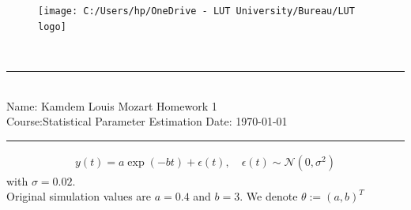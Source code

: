 \documentclass[11pt,a4paper]{article}
\begin{document}
	\begin{figure}
		\centering
		\texttt{[image: C:/Users/hp/OneDrive - LUT University/Bureau/LUT logo]}
	\end{figure}
	\thispagestyle{empty}
	\begin{center}
		\textbf{\\[0.5cm]
		}
		\vspace{0.01cm}
	\end{center}
	
	\noindent
	\rule{17cm}{0.2cm}\\[0.3cm]
	Name: Kamdem Louis Mozart \hfill Homework 1\\[0.1cm]
	Course:Statistical Parameter Estimation \hfill Date: \today\\
	\rule{17cm}{0.05cm}
	\vspace{1.0cm}
	\begin{align*}
		y(t) = a\exp(-bt)+\epsilon(t),\quad \epsilon(t)\sim\mathcal{N}(0,\sigma^{2})
	\end{align*}
with $ \sigma = 0.02 $. \\
Original simulation values are $ a = 0.4 $ and $ b = 3 $. We denote $ \theta := (a, b)^{T} $
\end{document}
